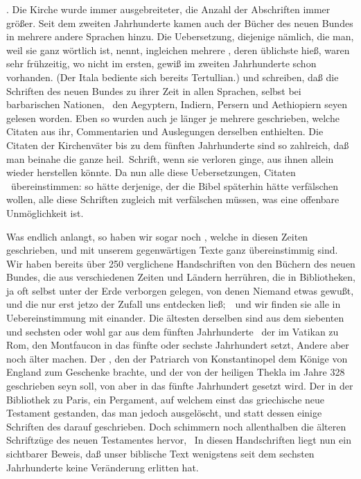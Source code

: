 \begin{aufza}[1)]
\item {}. Die Kirche wurde immer ausgebreiteter, die Anzahl der Abschriften immer größer. Seit dem zweiten Jahrhunderte kamen auch  der Bücher des neuen Bundes in mehrere andere Sprachen hinzu. Die  Uebersetzung, diejenige nämlich, die man, weil sie ganz wörtlich ist,  nennt, ingleichen mehrere , deren üblichste  hieß, waren sehr frühzeitig, wo nicht im ersten, gewiß im zweiten Jahrhunderte schon vorhanden. (Der Itala bediente sich bereits Tertullian.)  und  schreiben, daß die Schriften des neuen Bundes zu ihrer Zeit in allen Sprachen, selbst bei barbarischen Nationen, \zB\ den Aegyptern, Indiern, Persern und Aethiopiern seyen gelesen worden. Eben so wurden auch je länger je mehrere  geschrieben, welche Citaten aus ihr, Commentarien und Auslegungen derselben enthielten. Die Citaten der Kirchenväter bis zu dem fünften Jahrhunderte sind so zahlreich, daß man beinahe die ganze heil.\ Schrift, wenn sie verloren ginge, aus ihnen allein wieder herstellen könnte. Da nun alle diese Uebersetzungen, Citaten \usw\ übereinstimmen: so hätte derjenige, der die Bibel späterhin hätte verfälschen wollen, alle diese Schriften zugleich mit verfälschen müssen, was eine offenbare Unmöglichkeit ist.
\item Was endlich  anlangt, so haben wir sogar noch , welche in diesen Zeiten geschrieben, und mit unserem gegenwärtigen Texte ganz übereinstimmig sind. Wir haben bereits über 250 verglichene Handschriften von den Büchern des neuen Bundes, die aus verschiedenen Zeiten und Ländern herrühren, die in Bibliotheken, ja oft selbst unter der Erde verborgen gelegen, von denen Niemand etwas gewußt, und die nur erst jetzo der Zufall uns entdecken ließ;~\ und wir finden sie alle in Uebereinstimmung mit einander. Die ältesten derselben sind aus dem siebenten und sechsten oder wohl gar aus dem fünften Jahrhunderte \zB\ der  im Vatikan zu Rom, den Montfaucon in das fünfte oder sechste Jahrhundert setzt, Andere aber noch älter machen. Der , den der Patriarch von Konstantinopel  dem Könige  von England zum Geschenke brachte, und der von der heiligen Thekla im Jahre 328 geschrieben seyn soll, von  aber in das fünfte Jahrhundert gesetzt wird. Der  in der Bibliothek zu Paris, ein Pergament, auf welchem einst das griechische neue Testament gestanden, das man jedoch ausgelöscht, und statt dessen einige Schriften des  darauf geschrieben. Doch schimmern noch allenthalben die älteren Schriftzüge des neuen Testamentes hervor, \usw\ In diesen Handschriften liegt nun ein sichtbarer Beweis, daß unser biblische Text wenigstens seit dem sechsten Jahrhunderte keine Veränderung erlitten hat.

\end{aufza}
